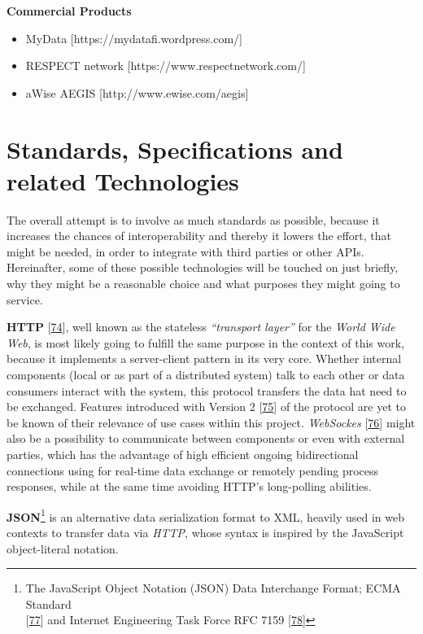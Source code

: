 \documentclass[12pt,english,a4paper,titlepage,cleardoublepage=empty,dottedtoc]{report}
\providecommand{\tightlist}{%
  \setlength{\itemsep}{0pt}\setlength{\parskip}{0pt}}
\begin{document}
\textbf{Commercial Products}

\begin{itemize}
\tightlist
\item
  MyData {[}https://mydatafi.wordpress.com/{]}
\item
  RESPECT network {[}https://www.respectnetwork.com/{]}
\item
  aWise AEGIS {[}http://www.ewise.com/aegis{]}
\end{itemize}

\hypertarget{standards-specifications-and-related-technologies}{\section{Standards,
Specifications and related
Technologies}\label{standards-specifications-and-related-technologies}}

The overall attempt is to involve as much standards as possible, because
it increases the chances of interoperability and thereby it lowers the
effort, that might be needed, in order to integrate with third parties
or other APIs. Hereinafter, some of these possible technologies will be
touched on just briefly, why they might be a reasonable choice and what
purposes they might going to service.

\textbf{\protect\hypertarget{link_http}{}{HTTP}}
{[}\protect\hyperlink{ref-web_spec_http1}{74}{]}, well known as the
stateless \emph{``transport layer''} for the \emph{World Wide Web}, is
most likely going to fulfill the same purpose in the context of this
work, because it implements a server-client pattern in its very core.
Whether internal components (local or as part of a distributed system)
talk to each other or data consumers interact with the system, this
protocol transfers the data hat need to be exchanged. Features
introduced with Version 2
{[}\protect\hyperlink{ref-web_spec_http2}{75}{]} of the protocol are yet
to be known of their relevance of use cases within this project.
\emph{WebSockes} {[}\protect\hyperlink{ref-web_spec_websockets}{76}{]}
might also be a possibility to communicate between components or even
with external parties, which has the advantage of high efficient ongoing
bidirectional connections using for real-time data exchange or remotely
pending process responses, while at the same time avoiding HTTP's
long-polling abilities.

\textbf{JSON}\footnote{The JavaScript Object Notation (JSON) Data
  Interchange Format; ECMA Standard\\
  {[}\protect\hyperlink{ref-web_spec_json}{77}{]} and Internet
  Engineering Task Force RFC 7159
  {[}\protect\hyperlink{ref-web_rfc_json}{78}{]}} is an alternative data
serialization format to XML, heavily used in web contexts to transfer
data via \emph{HTTP}, whose syntax is inspired by the JavaScript
object-literal notation.
\end{document}
